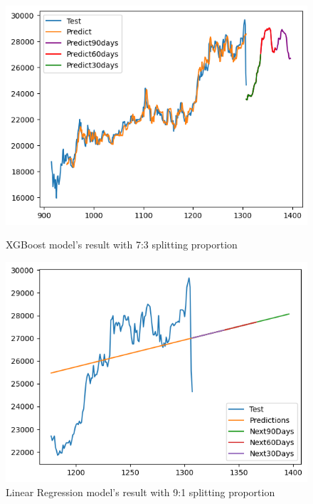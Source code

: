 \documentclass{ieeeojies}
\begin{document}
\begin{figure}[H]
    \centering
    \begin{minipage}{0.45\linewidth}
        \centering
        \includegraphics[width=\linewidth]{bibliography/diagram/XGBoost-ACB.png}
        \caption{XGBoost model’s result with 7:3 splitting proportion}
        \label{fig:XGBoost}
    \end{minipage}
    \hfill
    \begin{minipage}{0.45\linewidth}
        \centering
        \includegraphics[width=\linewidth]{bibliography/diagram/LR-ACB.png}
        \caption{Linear Regression model’s result with 9:1 splitting proportion}
        \label{fig:LR}
    \end{minipage}
\end{figure}
\end{document}

